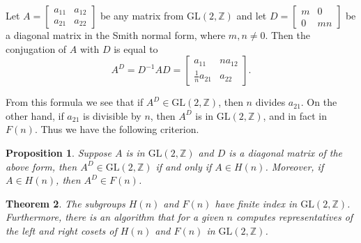 \documentclass[fontsize=11pt,DIV=13,paper=letter]{scrartcl}
\newtheorem{theorem}{Theorem}\newtheorem{proposition}[theorem]{Proposition}
\theoremstyle{definition}
\newcommand{\Z}{\mathbb{Z}}
\newcommand{\GL}{\mathrm{GL}(2,\Z)}
\begin{document}
Let $A=\begin{bmatrix} a_{11} & a_{12}\\ a_{21} & a_{22} \end{bmatrix}$ be any matrix from $\GL$ and let $D=\begin{bmatrix} m & 0\\ 0 & mn \end{bmatrix}$ be a diagonal matrix in the Smith normal form, where $m,n\neq 0$. Then the conjugation of $A$ with $D$ is equal to
\[
A^D = D^{-1}AD = \begin{bmatrix} a_{11} & na_{12}\\ \frac{1}{n}a_{21} & a_{22} \end{bmatrix}\!.
\]

From this formula we see that if $A^D\in \GL$, then $n$ divides $a_{21}$. On the other hand, if $a_{21}$ is divisible by $n$, then $A^D$ is in $\GL$, and in fact in $F(n)$. Thus we have the following criterion.
\begin{proposition}\label{prop:conj}
Suppose $A$ is in $\GL$ and $D$ is a diagonal matrix of the above form, then $A^D\in \GL$ if and only if $A\in H(n)$. Moreover, if $A\in H(n)$, then $A^D\in F(n)$.
\end{proposition}

\begin{theorem}\label{thm:ind}
The subgroups $H(n)$ and $F(n)$ have finite index in $\GL$. Furthermore, there is an algorithm that for a given $n$ computes representatives of the left and right cosets of $H(n)$ and $F(n)$ in $\GL$.
\end{theorem}
\end{document}
